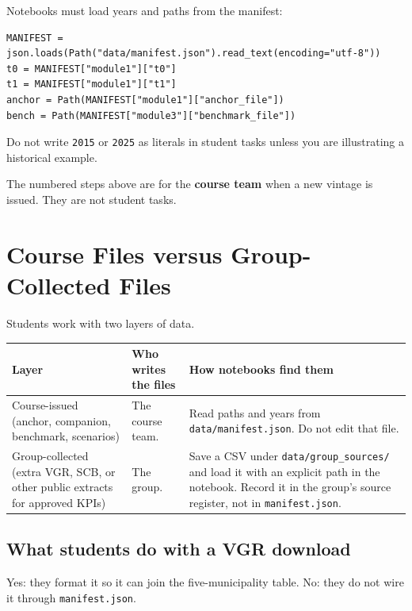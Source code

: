 \documentclass[11pt,a4paper]{article}
\begin{document}
Notebooks must load years and paths from the manifest:
\begin{verbatim}
MANIFEST = json.loads(Path("data/manifest.json").read_text(encoding="utf-8"))
t0 = MANIFEST["module1"]["t0"]
t1 = MANIFEST["module1"]["t1"]
anchor = Path(MANIFEST["module1"]["anchor_file"])
bench = Path(MANIFEST["module3"]["benchmark_file"])
\end{verbatim}

Do not write \texttt{2015} or \texttt{2025} as literals in student tasks
unless you are illustrating a historical example.

The numbered steps above are for the \textbf{course team} when a
new vintage is issued. They are not student tasks.

\section{Course Files versus Group-Collected Files}

Students work with two layers of data.

\begin{center}
\small
\begin{tabularx}{\textwidth}{@{}p{}p{}X@{}}
\toprule
Layer & Who writes the files & How notebooks find them \\
\midrule
Course-issued
(anchor, companion,
benchmark, scenarios) &
The course team. &
Read paths and years from
\texttt{data/manifest.json}.
Do not edit that file. \\[0.8em]
Group-collected
(extra VGR, SCB, or
other public extracts
for approved KPIs) &
The group. &
Save a CSV under
\texttt{data/group\_sources/}
and load it with an explicit
path in the notebook.
Record it in the group's
source register, not in
\texttt{manifest.json}. \\
\bottomrule
\end{tabularx}
\end{center}

\subsection{What students do with a VGR download}

Yes: they format it so it can join the five-municipality table.
No: they do not wire it through \texttt{manifest.json}.
\end{document}
